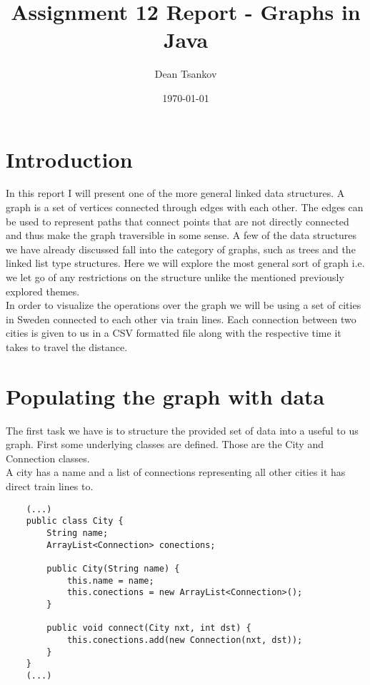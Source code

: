 \documentclass[a4paper,11pt]{article}
\begin{document}
\title{
    \textbf{Assignment 12 Report - Graphs in Java}
}
\author{Dean Tsankov}
\date{\today}

\maketitle

\section*{Introduction}

In this report I will present one of the more general linked data structures. A graph is a set of vertices connected through edges with each other. The edges can be used to represent paths that connect points that are not directly connected and thus make the graph traversible in some sense. A few of the data structures we have already discussed fall into the category of graphs, such as trees and the linked list type structures. Here we will explore the most general sort of graph i.e. we let go of any restrictions on the structure unlike the mentioned previously explored themes.
\\

In order to visualize the operations over the graph we will be using a set of cities in Sweden connected to each other via train lines. Each connection between two cities is given to us in a CSV formatted file along with the respective time it takes to travel the distance.

\section*{Populating the graph with data}

The first task we have is to structure the provided set of data into a useful to us graph. First some underlying classes are defined. Those are the City and Connection classes. 
\\

A city has a name and a list of connections representing all other cities it has direct train lines to. 
\begin{verbatim}
    (...)
    public class City {
        String name;
        ArrayList<Connection> conections;

        public City(String name) {
            this.name = name;
            this.conections = new ArrayList<Connection>();
        }
        
        public void connect(City nxt, int dst) {
            this.conections.add(new Connection(nxt, dst));
        }
    }
    (...)
\end{verbatim}
\end{document}
